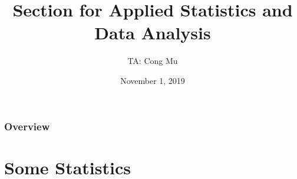 \documentclass[serif,mathserif,professionalfont]{beamer}
\title[Section for EN.553.413/613]{Section for Applied Statistics and Data Analysis} %
\author{TA: Cong Mu} %
\institute[cmu2@jhu.edu] %
{
Office Hour: Wednesday 10:00AM - 12:00PM
\medskip
\textit{} %
}
\date{November 1, 2019} %
\begin{document}
\begin{frame}
\titlepage %
\end{frame}

\begin{frame}
\frametitle{Overview} %
\tableofcontents %
\end{frame}




\section{Some Statistics}


%	
%    	
	
\end{document}
